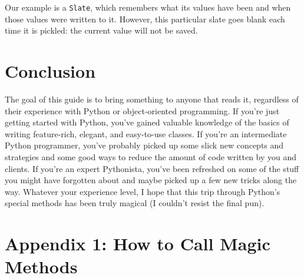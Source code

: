 \documentclass[a4paper,11pt]{article}
\newcommand{\code}[1]{\texttt{#1}}
\begin{document}
Our example is a \code{Slate}, which remembers what its values have been and when those values were written to it. However, this particular slate goes blank each time it is pickled: the current value will not be saved.



\section{Conclusion}

The goal of this guide is to bring something to anyone that reads it, regardless of their experience with Python or object-oriented programming. If you're just getting started with Python, you've gained valuable knowledge of the basics of writing feature-rich, elegant, and easy-to-use classes. If you're an intermediate Python programmer, you've probably picked up some slick new concepts and strategies and some good ways to reduce the amount of code written by you and clients. If you're an expert Pythonista, you've been refreshed on some of the stuff you might have forgotten about and maybe picked up a few new tricks along the way. Whatever your experience level, I hope that this trip through Python's special methods has been truly magical (I couldn't resist the final pun).

\newpage
\section{Appendix 1: How to Call Magic Methods}
\end{document}
